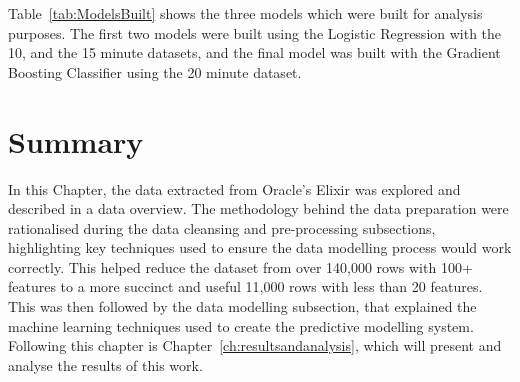 Table~\ref{tab:ModelsBuilt} shows the three models which were built for analysis purposes.
The first two models were built using the Logistic Regression with the 10, and the 15 minute datasets, and the final model was built with the Gradient Boosting Classifier using the 20 minute dataset. \\

\section{Summary}\label{sec:MethodSummary}
In this Chapter, the data extracted from Oracle's Elixir was explored and described in a data overview.
The methodology behind the data preparation were rationalised during the data cleansing and pre-processing subsections, highlighting key techniques used to ensure the data modelling process would work correctly.
This helped reduce the dataset from over 140,000 rows with 100+ features to a more succinct and useful 11,000 rows with less than 20 features.
This was then followed by the data modelling subsection, that explained the machine learning techniques used to create the predictive modelling system.
Following this chapter is Chapter~\ref{ch:resultsandanalysis}, which will present and analyse the results of this work.

